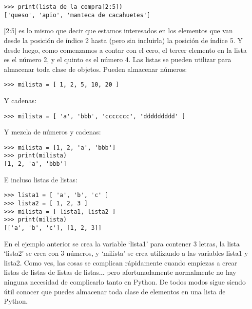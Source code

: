 \begin{listing}
\begin{verbatim}
>>> print(lista_de_la_compra[2:5])
['queso', 'apio', 'manteca de cacahuetes']
\end{verbatim}
\end{listing}

[2:5] es lo mismo que decir que estamos interesados en los elementos que van desde la posición de índice 2 hasta (pero sin incluirla) la posición de índice 5. Y desde luego, como comenzamos a contar con el cero, el tercer elemento en la lista es el número 2, y el quinto es el número 4. Las listas se pueden utilizar para almacenar toda clase de objetos.  Pueden almacenar números:

\begin{listing}
\begin{verbatim}
>>> milista = [ 1, 2, 5, 10, 20 ]
\end{verbatim}
\end{listing}

\noindent
Y cadenas:

\begin{listing}
\begin{verbatim}
>>> milista = [ 'a', 'bbb', 'ccccccc', 'ddddddddd' ]
\end{verbatim}
\end{listing}

\noindent
Y mezcla de números y cadenas:

\begin{listing}
\begin{verbatim}
>>> milista = [1, 2, 'a', 'bbb']
>>> print(milista)
[1, 2, 'a', 'bbb']
\end{verbatim}
\end{listing}

\noindent
E incluso listas de listas:

\begin{listing}
\begin{verbatim}
>>> lista1 = [ 'a', 'b', 'c' ]
>>> lista2 = [ 1, 2, 3 ]
>>> milista = [ lista1, lista2 ]
>>> print(milista)
[['a', 'b', 'c'], [1, 2, 3]]
\end{verbatim}
\end{listing}

En el ejemplo anterior se crea la variable `lista1' para contener 3 letras, la lista `lista2' se crea con 3 números, y `milista' se crea utilizando a las variables lista1 y lista2. Como ves, las cosas se complican rápidamente cuando empiezas a crear listas de listas de listas de listas$\dots$ pero afortunadamente normalmente no hay ninguna necesidad de complicarlo tanto en Python. De todos modos sigue siendo útil conocer que puedes almacenar toda clase de elementos en una lista de Python. 


